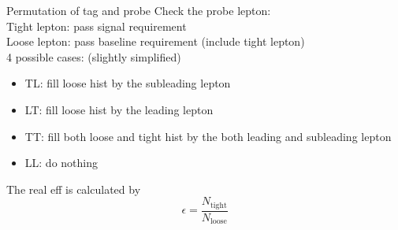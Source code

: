 \documentclass[mathserif,serif]{beamer}
\begin{document}
\begin{frame}{Permutation of tag and probe}
Check the probe lepton: \\
Tight lepton: pass signal requirement \\
Loose lepton: pass baseline requirement (include tight lepton) \\
4 possible cases: (slightly simplified)
\begin{itemize}
\item TL: fill loose hist by the subleading lepton
\item LT: fill loose hist by the leading lepton
\item TT: fill both loose and tight hist by the both leading and subleading lepton
\item LL: do nothing
\end{itemize}
The real eff is calculated by
\begin{equation*}
\epsilon = \frac{N_{\text{tight}}}{N_{\text{loose}}}
\end{equation*}
\end{frame}
\end{document}
